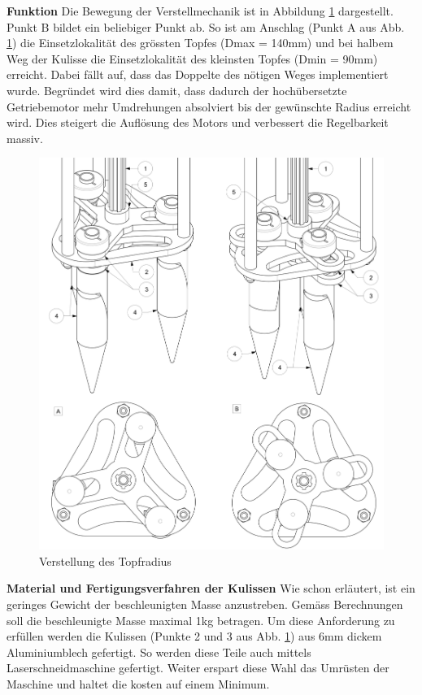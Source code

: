 \textbf{Funktion}
\newline
Die Bewegung der Verstellmechanik ist in Abbildung \ref{fig:motion_vm} dargestellt. Punkt B bildet ein beliebiger Punkt ab. So ist am Anschlag (Punkt A aus Abb. \ref{fig:motion_vm}) die Einsetzlokalität des grössten Topfes (Dmax = 140mm) und bei halbem Weg der Kulisse die Einsetzlokalität des kleinsten Topfes (Dmin = 90mm) erreicht. Dabei fällt auf, dass das Doppelte des nötigen Weges implementiert wurde. Begründet wird dies damit, dass dadurch der hochübersetzte Getriebemotor mehr Umdrehungen absolviert bis der gewünschte Radius erreicht wird. Dies steigert die Auflösung des Motors und verbessert die Regelbarkeit massiv.
	\begin{figure}[H]
	\includegraphics[scale=0.53]{Illustrationen/6-Umsetzung/motion_vm.jpg}
	\caption{Verstellung des Topfradius}
	\label{fig:motion_vm}
	\end{figure}
\textbf{Material und Fertigungsverfahren der Kulissen}
\newline
Wie schon erläutert, ist ein geringes Gewicht der beschleunigten Masse anzustreben. Gemäss Berechnungen soll die beschleunigte Masse maximal 1kg betragen. Um diese Anforderung zu erfüllen werden die Kulissen (Punkte 2 und 3 aus Abb. \ref{fig:motion_vm}) aus 6mm dickem Aluminiumblech gefertigt. So werden diese Teile auch mittels Laserschneidmaschine gefertigt. Weiter erspart diese Wahl das Umrüsten der Maschine und haltet die kosten auf einem Minimum.